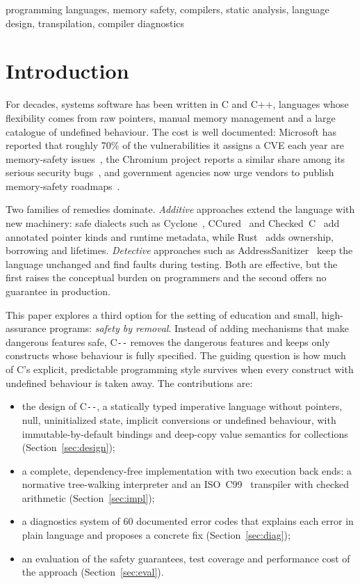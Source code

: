 \documentclass[conference]{IEEEtran}
\newcommand{\cmm}{C\texttt{-{}-}}
\begin{document}
\begin{IEEEkeywords}
programming languages, memory safety, compilers, static analysis, language design, transpilation, compiler diagnostics
\end{IEEEkeywords}

\section{Introduction}
For decades, systems software has been written in C and C++, languages whose flexibility comes from raw
pointers, manual memory management and a large catalogue of undefined behaviour. The cost is well documented:
Microsoft has reported that roughly 70\% of the vulnerabilities it assigns a CVE each year are memory-safety
issues~\cite{miller2019}, the Chromium project reports a similar share among its serious security
bugs~\cite{chromium_memsafety}, and government agencies now urge vendors to publish memory-safety
roadmaps~\cite{cisa2023}.

Two families of remedies dominate. \emph{Additive} approaches extend the language with new machinery:
safe dialects such as Cyclone~\cite{cyclone}, CCured~\cite{ccured} and Checked~C~\cite{checkedc} add
annotated pointer kinds and runtime metadata, while Rust~\cite{rust} adds ownership, borrowing and
lifetimes. \emph{Detective} approaches such as AddressSanitizer~\cite{asan} keep the language unchanged
and find faults during testing. Both are effective, but the first raises the conceptual burden on
programmers and the second offers no guarantee in production.

This paper explores a third option for the setting of education and small, high-assurance programs:
\emph{safety by removal}. Instead of adding mechanisms that make dangerous features safe, \cmm{} removes the
dangerous features and keeps only constructs whose behaviour is fully specified. The guiding question is how
much of C's explicit, predictable programming style survives when every construct with undefined behaviour
is taken away. The contributions are:
\begin{itemize}
  \item the design of \cmm{}, a statically typed imperative language without pointers, null, uninitialized
        state, implicit conversions or undefined behaviour, with immutable-by-default bindings and
        deep-copy value semantics for collections (Section~\ref{sec:design});
  \item a complete, dependency-free implementation with two execution back ends: a normative tree-walking
        interpreter and an ISO~C99~\cite{iso_c99} transpiler with checked arithmetic (Section~\ref{sec:impl});
  \item a diagnostics system of 60 documented error codes that explains each error in plain language and
        proposes a concrete fix (Section~\ref{sec:diag});
  \item an evaluation of the safety guarantees, test coverage and performance cost of the approach
        (Section~\ref{sec:eval}).
\end{itemize}
\end{document}
